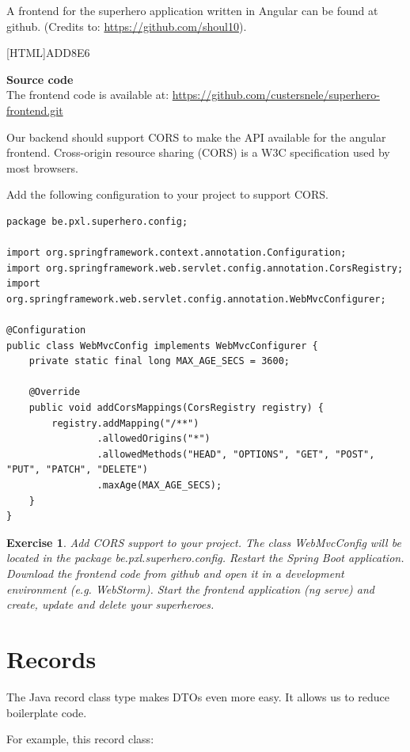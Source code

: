 \documentclass[a4paper, 12pt]{report}
\newenvironment{boxexercise}
{\begin{tcolorbox}
[enhanced jigsaw,breakable,pad at break*=1mm,
 colback=tsyellow!20,boxrule=0pt,frame hidden]}
{\end{tcolorbox}}
\newtheorem{envoefening}{\textbf{Exercise}}[chapter]
\newenvironment{oefening}
               {\begin{boxexercise}\begin{envoefening}}
               {\end{envoefening}\end{boxexercise}}
\begin{document}
A frontend for the superhero application written in Angular can be found at github.  (Credits to: \url{https://github.com/shoul10}).


 [HTML]{ADD8E6}{\parbox{\textwidth}{%
\noindent \textbf{Source code}\\
The frontend code is available at: \url{https://github.com/custersnele/superhero-frontend.git}
}}

Our backend should support CORS to make the API available for the angular frontend.  Cross-origin resource sharing (CORS) is a W3C specification used by most browsers.  

Add the following configuration to your project to support CORS.

\begin{lstlisting}[frame=single]
package be.pxl.superhero.config;

import org.springframework.context.annotation.Configuration;
import org.springframework.web.servlet.config.annotation.CorsRegistry;
import org.springframework.web.servlet.config.annotation.WebMvcConfigurer;

@Configuration
public class WebMvcConfig implements WebMvcConfigurer {
    private static final long MAX_AGE_SECS = 3600;

    @Override
    public void addCorsMappings(CorsRegistry registry) {
        registry.addMapping("/**")
                .allowedOrigins("*")
                .allowedMethods("HEAD", "OPTIONS", "GET", "POST", "PUT", "PATCH", "DELETE")
                .maxAge(MAX_AGE_SECS);        
    }
}
\end{lstlisting}

\begin{oefening}
Add CORS support to your project. The class WebMvcConfig will be located in the package  \textit{be.pxl.superhero.config}.  Restart the Spring Boot application.
Download the frontend code from github and open it in a  development environment (e.g.  WebStorm).  Start the frontend application (ng serve) and create, update and delete your superheroes.
\end{oefening}

\section{Records}

The Java record class type makes DTOs even more easy. It allows us to reduce boilerplate code. 

For example, this record class:
\end{document}
